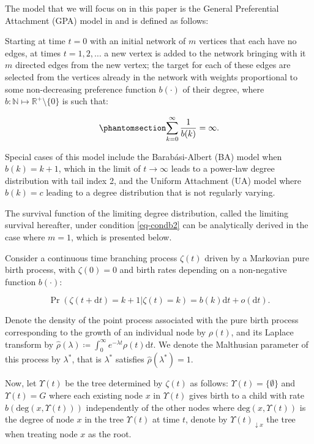 \documentclass[
  sn-basic,
  10pt,
]{sn-jnl}
\theoremstyle{plain}
\theoremstyle{plain}
\theoremstyle{remark}
\begin{document}
The model that we will focus on in this paper is the General
Preferential Attachment (GPA) model in \citet{rudas07} and is defined as
follows:

Starting at time \(t=0\) with an initial network of \(m\) vertices that
each have no edges, at times \(t=1,2,\ldots\) a new vertex is added to
the network bringing with it \(m\) directed edges from the new vertex;
the target for each of these edges are selected from the vertices
already in the network with weights proportional to some non-decreasing
preference function \(b(\cdot)\) of their degree, where
\(b: \mathbb N \mapsto \mathbb R^+\setminus\{0\}\) is such that:

\begin{equation}\phantomsection\label{eq-condb2}{
\sum_{k=0}^\infty\frac{1}{b(k)} = \infty.
}\end{equation}

Special cases of this model include the Barab\'asi-Albert (BA) model when $b(k) = k+1$, which in the limit of $t\rightarrow \infty$ leads to a power-law degree distribution with tail index 2, and the Uniform Attachment (UA) model where $b(k)=c$ leading to a degree distribution that is not regularly varying.

The survival function of the limiting degree distribution, called the
limiting survival hereafter, under condition \ref{eq-condb2} can be
analytically derived in the case where \(m=1\), which is presented
below.

Consider a continuous time branching process \(\zeta(t)\) driven by a
Markovian pure birth process, with \(\zeta(0)=0\) and birth rates
depending on a non-negative function \(b(\cdot)\):

\[
\Pr(\zeta(t+\text{d}t)=k+1|\zeta(t)=k) = b(k)\text{d}t + o(\text{d}t).
\]

Denote the density of the point process associated with the pure birth
process corresponding to the growth of an individual node by
\(\rho(t)\), and its Laplace transform by
\(\hat \rho(\lambda)\coloneq \int_0^\infty e^{-\lambda t}\rho(t)\text{d}t\).
We denote the Malthusian parameter of this process by \(\lambda^*\),
that is \(\lambda^*\) satisfies \(\hat\rho(\lambda^*) = 1\).

Now, let \(\Upsilon(t)\) be the tree determined by \(\zeta(t)\) as
follows: \(\Upsilon(t)=\{\emptyset\}\) and \(\Upsilon(t)=G\) where each
existing node \(x\) in \(\Upsilon(t)\) gives birth to a child with rate
\(b(\mathrm{deg}(x, \Upsilon(t)))\) independently of the other nodes
where \(\mathrm{deg}(x, \Upsilon(t))\) is the degree of node \(x\) in
the tree \(\Upsilon(t)\) at time \(t\), denote by
\(\Upsilon(t)_{\downarrow x}\) the tree when treating node \(x\) as the
root.
\end{document}
